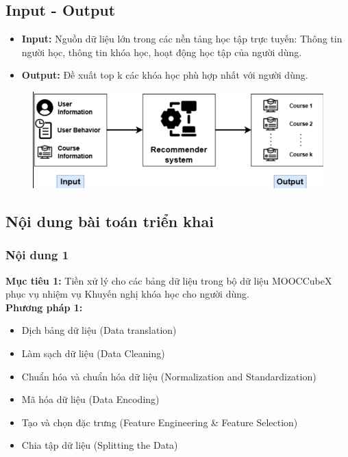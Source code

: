\subsection{Input - Output}
\begin{itemize}
    \item \textbf{Input:} Nguồn dữ liệu lớn trong các nền tảng học tập trực tuyến: Thông tin người học, thông tin khóa học, hoạt động học tập của người dùng.
    \item \textbf{Output:} Đề xuất top k các khóa học phù hợp nhất với người dùng.
\end{itemize}
\begin{figure}[h]
    \centering
    \includegraphics[width=0.75\linewidth]{figures/55.png}
\end{figure}
\subsection{Nội dung bài toán triển khai}
\subsubsection{Nội dung 1}
\textbf{Mục tiêu 1:} Tiền xử lý cho các bảng dữ liệu trong bộ dữ liệu MOOCCubeX phục vụ nhiệm vụ Khuyến nghị khóa học cho người dùng.\\
\textbf{Phương pháp 1:}
\begin{itemize}
    \item Dịch bảng dữ liệu (Data translation)
    \item Làm sạch dữ liệu (Data Cleaning)
    \item Chuẩn hóa và chuẩn hóa dữ liệu (Normalization and Standardization)
    \item Mã hóa dữ liệu (Data Encoding)
    \item Tạo và chọn đặc trưng (Feature Engineering \& Feature Selection)
    \item Chia tập dữ liệu (Splitting the Data)
\end{itemize}
